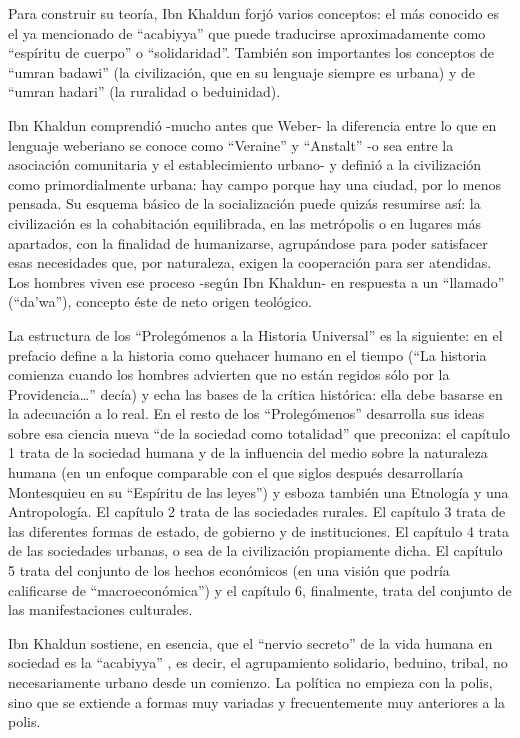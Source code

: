 \documentclass[
]{book}
\begin{document}
Para construir su teoría, Ibn Khaldun forjó varios conceptos: el más conocido es el ya mencionado de ``acabiyya'' que puede traducirse aproximadamente como ``espíritu de cuerpo'' o ``solidaridad''. También son importantes los conceptos de ``umran badawi'' (la civilización, que en su lenguaje siempre es urbana) y de ``umran hadari'' (la ruralidad o beduinidad).

Ibn Khaldun comprendió -mucho antes que Weber- la diferencia entre lo que en lenguaje weberiano se conoce como ``Veraine'' y ``Anstalt'' -o sea entre la asociación comunitaria y el establecimiento urbano- y definió a la civilización como primordialmente urbana: hay campo porque hay una ciudad, por lo menos pensada. Su esquema básico de la socialización puede quizás resumirse así: la civilización es la cohabitación equilibrada, en las metrópolis o en lugares más apartados, con la finalidad de humanizarse, agrupándose para poder satisfacer esas necesidades que, por naturaleza, exigen la cooperación para ser atendidas. Los hombres viven ese proceso -según Ibn Khaldun- en respuesta a un ``llamado'' (``da'wa''), concepto éste de neto origen teológico.

La estructura de los ``Prolegómenos a la Historia Universal'' es la siguiente: en el prefacio define a la historia como quehacer humano en el tiempo (``La historia comienza cuando los hombres advierten que no están regidos sólo por la Providencia\ldots{}'' decía) y echa las bases de la crítica histórica: ella debe basarse en la adecuación a lo real. En el resto de los ``Prolegómenos'' desarrolla sus ideas sobre esa ciencia nueva ``de la sociedad como totalidad'' que preconiza: el capítulo 1 trata de la sociedad humana y de la influencia del medio sobre la naturaleza humana (en un enfoque comparable con el que siglos después desarrollaría Montesquieu en su ``Espíritu de las leyes'') y esboza también una Etnología y una Antropología. El capítulo 2 trata de las sociedades rurales. El capítulo 3 trata de las diferentes formas de estado, de gobierno y de instituciones. El capítulo 4 trata de las sociedades urbanas, o sea de la civilización propiamente dicha. El capítulo 5 trata del conjunto de los hechos económicos (en una visión que podría calificarse de ``macroeconómica'') y el capítulo 6, finalmente, trata del conjunto de las manifestaciones culturales.

Ibn Khaldun sostiene, en esencia, que el ``nervio secreto'' de la vida humana en sociedad es la ``acabiyya'' , es decir, el agrupamiento solidario, beduino, tribal, no necesariamente urbano desde un comienzo. La política no empieza con la polis, sino que se extiende a formas muy variadas y frecuentemente muy anteriores a la polis.
\end{document}
